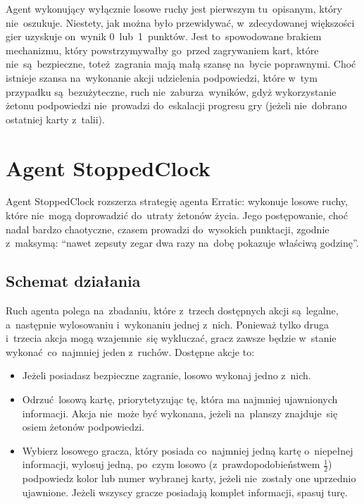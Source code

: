 \documentclass[declaration,shortabstract,inz]{iithesis}
\begin{document}
Agent wykonujący wyłącznie losowe ruchy jest pierwszym tu~opisanym, który nie~oszukuje. Niestety, jak można było przewidywać, w~zdecydowanej większości gier uzyskuje on~wynik 0~lub~1~punktów. Jest to~spowodowane brakiem mechanizmu, który powstrzymywałby go~przed zagrywaniem kart, które nie~są~bezpieczne, toteż~zagrania mają małą szansę na~bycie poprawnymi. Choć istnieje szansa na~wykonanie akcji udzielenia podpowiedzi, które w~tym przypadku są~bezużyteczne, ruch nie~zaburza wyników, gdyż wykorzystanie żetonu podpowiedzi nie~prowadzi do~eskalacji progresu gry (jeżeli nie~dobrano ostatniej karty z~talii).

\section{Agent StoppedClock}

Agent StoppedClock rozszerza strategię agenta Erratic: wykonuje losowe ruchy, które nie~mogą doprowadzić do~utraty żetonów życia. Jego postępowanie, choć nadal bardzo chaotyczne, czasem prowadzi do~wysokich punktacji, zgodnie z~maksymą: ``nawet zepsuty zegar dwa razy na~dobę pokazuje właściwą godzinę''.

\subsection*{Schemat działania}

Ruch agenta polega na~zbadaniu, które z~trzech dostępnych akcji są~legalne, a~następnie wylosowaniu i~wykonaniu jednej z~nich. Ponieważ tylko druga i~trzecia akcja mogą wzajemnie~się wykluczać, gracz zawsze będzie w~stanie wykonać co~najmniej jeden z~ruchów. Dostępne akcje to:

\begin{itemize}
	\item Jeżeli posiadasz bezpieczne zagranie, losowo wykonaj jedno z~nich.
	\item Odrzuć losową kartę, priorytetyzując tę, która ma najmniej ujawnionych informacji. Akcja nie~może być wykonana, jeżeli na~planszy znajduje~się osiem żetonów podpowiedzi.
	\item Wybierz losowego gracza, który posiada co~najmniej jedną kartę o~niepełnej informacji, wylosuj jedną, po~czym losowo (z~prawdopodobieństwem $\frac{1}{2}$) podpowiedz kolor lub numer wybranej karty, jeżeli nie~zostały one uprzednio ujawnione. Jeżeli wszyscy gracze posiadają komplet informacji, spasuj turę.
\end{itemize}
\end{document}
